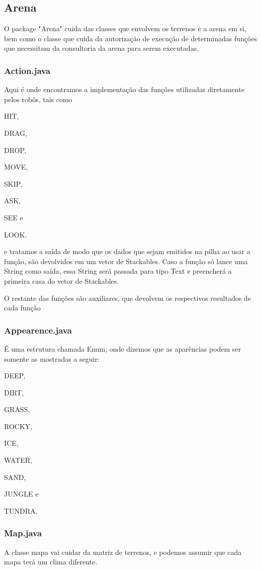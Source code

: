 \documentclass[a4paper]{article}
\begin{document}
	\subsection{Arena}
		O package "Arena" cuida das classes que envolvem os
		terrenos e a arena em si, bem como o classe que cuida
		da autorização de execução de determinadas funções que
		necessitam da consultoria da arena para serem executadas.
		
		\subsubsection{ Action.java }
		    Aqui é onde encontramos a implementação das funções
		    utilizadas diretamente pelos robôs, tais como 
		    {\textcolor{NavyBlue}{HIT},
		    {\textcolor{NavyBlue}{DRAG},
		    {\textcolor{NavyBlue}{DROP},
		    {\textcolor{NavyBlue}{MOVE},
		    {\textcolor{NavyBlue}{SKIP},
		    {\textcolor{NavyBlue}{ASK},
		    {\textcolor{NavyBlue}{SEE} e 
		    {\textcolor{NavyBlue}{LOOK}.
		    
		    e tratamos a saída de modo que os dados que sejam 
		    emitidos na pilha ao usar a função, são devolvidos em
		    um vetor de Stackables. 
		    Caso a função só lance uma String como saída, essa 
		    String será passada para tipo Text e preencherá a 
		    primeira casa do vetor de Stackables.
		    
		    O restante das funções são auxiliares, que devolvem
		    os respectivos resultados de cada função
		    
		\subsubsection{ Appearence.java }
		    É uma estrutura chamada Enum, onde dizemos que as
		    aparências podem ser somente as mostradas a seguir:
		    {\textcolor{NavyBlue}{DEEP},
		    {\textcolor{NavyBlue}{DIRT},
            {\textcolor{NavyBlue}{GRASS},
            {\textcolor{NavyBlue}{ROCKY},
            {\textcolor{NavyBlue}{ICE},
            {\textcolor{NavyBlue}{WATER},
            {\textcolor{NavyBlue}{SAND},
            {\textcolor{NavyBlue}{JUNGLE} e
            {\textcolor{NavyBlue}{TUNDRA}.
		
		\subsubsection{ Map.java }
		    A classe mapa vai cuidar da matriz de terrenos, e 
		    podemos assumir que cada mapa terá um clima diferente.
		    
}}}}}}}}}}}}}}}}}
\end{document}
